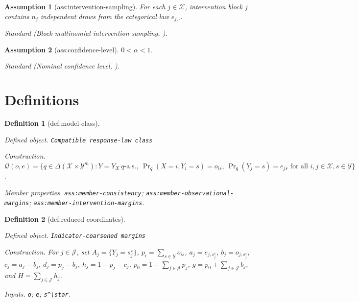 \documentclass{article}
\newtheorem{assumption}{Assumption}
\newtheorem{definition}{Definition}
\begin{document}
\begin{assumption}[ass:intervention-sampling]\label{ass:intervention-sampling}
For each \(j\in\mathcal X\), intervention block \(j\) contains \(n_j\) independent draws from the categorical law \(e_{j,\cdot}\).
\par\smallskip\noindent\emph{Standard} (Block-multinomial intervention sampling, \cite{ChengMaoPearlLi2026DeltaPoC}).
\end{assumption}

\begin{assumption}[ass:confidence-level]\label{ass:confidence-level}
\(0<\alpha<1\).
\par\smallskip\noindent\emph{Standard} (Nominal confidence level, \cite{HorowitzLee2023OptimizationInference}).
\end{assumption}

\section{Definitions}

\begin{definition}[def:model-class]\label{def:model-class}
\par\smallskip\noindent\emph{Defined object.} \texttt{Compatible response-\allowbreak{}law class}
\par\smallskip\noindent\emph{Construction.} \(\mathcal Q(o,e)=\{q\in\Delta(\mathcal X\times\mathcal Y^m):Y=Y_X\ q\text{-a.s.},\ \Pr_q(X=i,Y_i=s)=o_{is},\ \Pr_q(Y_j=s)=e_{js}\text{ for all }i,j\in\mathcal X,s\in\mathcal Y\}\).
\par\smallskip\noindent\emph{Member properties.} \texttt{ass:\allowbreak{}member-\allowbreak{}consistency}; \texttt{ass:\allowbreak{}member-\allowbreak{}observational-\allowbreak{}margins}; \texttt{ass:\allowbreak{}member-\allowbreak{}intervention-\allowbreak{}margins}.
\end{definition}

\begin{definition}[def:reduced-coordinates]\label{def:reduced-coordinates}
\par\smallskip\noindent\emph{Defined object.} \texttt{Indicator-\allowbreak{}coarsened margins}
\par\smallskip\noindent\emph{Construction.} For \(j\in\mathcal J\), set \(A_j=\{Y_j=s_j^\star\}\), \(p_i=\sum_{s\in\mathcal Y}o_{is}\), \(a_j=e_{j,s_j^\star}\), \(b_j=o_{j,s_j^\star}\), \(c_j=a_j-b_j\), \(d_j=p_j-b_j\), \(h_j=1-p_j-c_j\), \(p_0=1-\sum_{j\in\mathcal J}p_j\), \(g=p_0+\sum_{j\in\mathcal J}b_j\), and \(H=\sum_{j\in\mathcal J}h_j\).
\par\smallskip\noindent\emph{Inputs.} \texttt{o}; \texttt{e}; \texttt{s\textasciicircum{}\textbackslash{}\allowbreak{}star}.
\end{definition}
\end{document}
